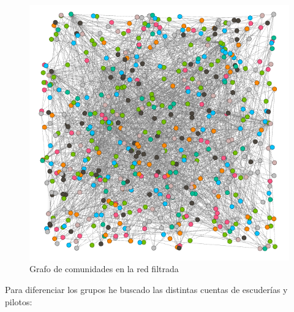 \begin{figure}[H]
	\centering
	\includegraphics[width=12cm]{../images/modularity-class}
	\caption{Grafo de comunidades en la red filtrada}
	\label{fig:modularity-class}
\end{figure}


Para diferenciar los grupos he buscado las distintas cuentas de escuderías y pilotos:

